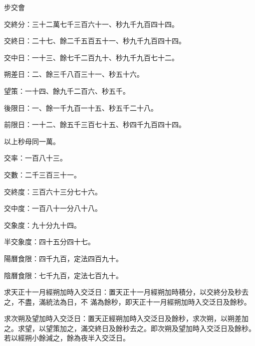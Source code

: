 
\begin{pinyinscope}

 步交會



 交終分：三十二萬七千三百六十一、秒九千九百四十四。



 交終日：二十七、餘二千五百五十一、秒九千九百四十四。



 交中日：一十三、餘七千二百九十、秒九千九百七十二。



 朔差日：二、餘三千八百三十一、秒五十六。



 望策：一十四、餘九千二百六、秒五千。



 後限日：一、餘一千九百一十五、秒五千二十八。



 前限日：一十二、餘五千三百七十五、秒四千九百四十四。



 以上秒母同一萬。



 交率：一百八十三。



 交數：二千三百三十一。



 交終度：三百六十三分七十六。



 交中度：一百八十一分八十八。



 交象度：九十分九十四。



 半交象度：四十五分四十七。



 陽曆食限：四千九百，定法四百九十。



 陰曆食限：七千九百，定法七百九十。



 求天正十一月經朔加時入交泛日：置天正十一月經朔加時積分，以交終分及秒去之，不盡，滿統法為日，不
 滿為餘秒，即天正十一月經朔加時入交泛日及餘秒。



 求次朔及望加時入交泛日：置天正經朔加時入交泛日及餘秒，求次朔，以朔差加之。求望，以望策加之，滿交終日及餘秒去之。即次朔及望加時入交泛日及餘秒。若以經朔小餘減之，餘為夜半入交泛日。




\end{pinyinscope}
